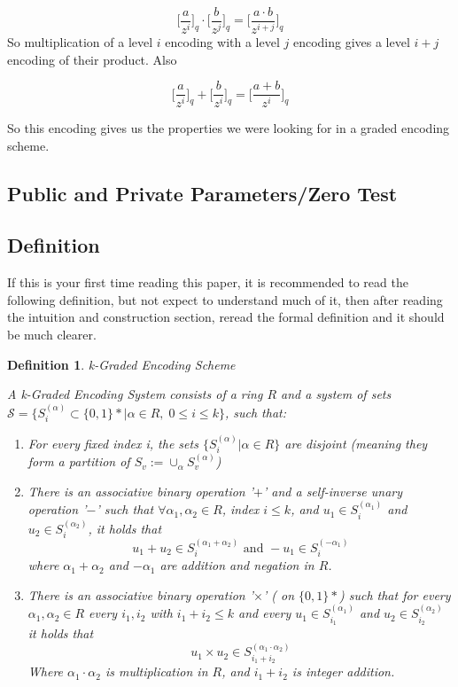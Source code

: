\documentclass[12pt,twoside]{reedthesis}
\newtheorem{definition}{Definition}
\begin{document}
    \newcommand{\encode}[2]{\bigg[ \frac{#2}{z^{#1}}\bigg]_q}
    $$
    \encode{i}{a} \cdot \encode{j}{b} = \encode{i+j}{a \cdot b}
   $$
   So multiplication of a level $i$ encoding with a level $j$ encoding gives a level $i+j$ encoding of their product. Also
   
   $$\encode{i}{a} + \encode{i}{b} = \encode{i}{a+b}$$
   
   So this encoding gives us the properties we were looking for in a graded encoding scheme. 
   
   \subsection{Public and Private Parameters/Zero Test}
  
    
     \subsection{Definition}
     If this is your first time reading this paper, it is recommended to read the following definition, but not expect to understand much of it, then after reading the intuition and construction section, reread the formal definition and it should be much clearer.
    
    \begin{definition}{k-Graded Encoding Scheme}
    \par A k-Graded Encoding System consists of a ring $R$ and a system of sets $\mathcal{S}= \{S_i^{(\alpha)} \subset \{0,1\}*| \alpha \in R, \; 0 \leq i \leq k \}$, such that:
    \begin{enumerate}
    \item For every fixed index i, the sets $\{S_i^{(\alpha)}| \alpha \in R \}$ are disjoint (meaning they form a partition of $S_v := \cup_\alpha S_v^{(\alpha)}$)
    
    \item There is an associative binary operation '$ + $' and a self-inverse unary operation '$-$' such that $\forall \alpha_1,\alpha_2 \in R$, index $i\leq k$, and $u_1 \in S_i^{(\alpha_1)}$ and $u_2 \in S_i^{(\alpha_2)}$, it holds that 
    $$u_1 + u_2 \in S_i^{(\alpha_1 + \alpha_2)} \text{ and } -u_1 \in S_i^{(-\alpha_1)}$$
    where $\alpha_1 + \alpha_2$ and $-\alpha_1$ are addition and negation in $R$.
    
    \item There is an associative binary operation '$\times$' ( on $\{ 0,1 \}*$) such that for every $\alpha_1,\alpha_2 \in R$ every $i_1,i_2$ with $i_1+i_2 \leq k$ and every $u_1 \in S_{i_1}^{(\alpha_1)}$ and $u_2 \in S_{i_2}^{(\alpha_2)}$ it holds that 
    $$u_1 \times u_2 \in S_{i_1 + i_2}^{(\alpha_1 \cdot \alpha_2)} $$
    Where $\alpha_1 \cdot \alpha_2$ is multiplication in $R$, and $i_1 + i_2$ is integer addition.
    
    
    \end{enumerate}
    
    
    \end{definition}
    
\end{document}
